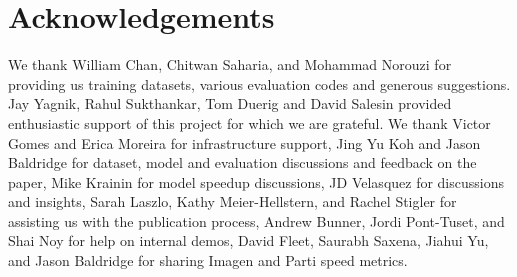 \documentclass[nohyperref]{article}
\theoremstyle{plain}
\theoremstyle{definition}
\theoremstyle{remark}
\begin{document}













\section*{Acknowledgements}
We thank William Chan, Chitwan Saharia, and Mohammad Norouzi  for providing us training datasets, various evaluation codes and generous suggestions. Jay Yagnik, Rahul Sukthankar, Tom Duerig and David Salesin provided enthusiastic support of this project for which we are grateful.
We thank Victor Gomes and Erica Moreira for infrastructure support,  Jing Yu Koh and Jason Baldridge for dataset, model and evaluation discussions and feedback on the paper, Mike Krainin for model speedup discussions, JD Velasquez for discussions and insights, Sarah Laszlo, Kathy Meier-Hellstern, and Rachel Stigler for assisting us with the publication process, Andrew Bunner, Jordi Pont-Tuset, and Shai Noy for help on internal demos, David Fleet, Saurabh Saxena, Jiahui Yu, and Jason Baldridge for sharing Imagen and Parti speed metrics.




\newpage
\appendix
\onecolumn

\end{document}
